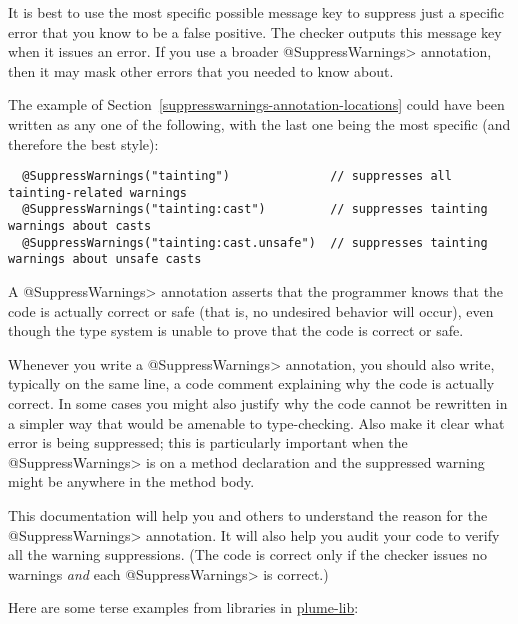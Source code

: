 

\label{compiler-message-keys}

It is best to use the most specific possible message key to suppress just a
specific error that you know to be a false positive.  The checker outputs
this message key when it issues an error.  If you use a broader
\<@SuppressWarnings> annotation, then it may mask other errors that you
needed to know about.

The example of Section~\ref{suppresswarnings-annotation-locations} could
have been written as any one of the following, with the last one being the
most specific (and therefore the best style):

\begin{Verbatim}
  @SuppressWarnings("tainting")              // suppresses all tainting-related warnings
  @SuppressWarnings("tainting:cast")         // suppresses tainting warnings about casts
  @SuppressWarnings("tainting:cast.unsafe")  // suppresses tainting warnings about unsafe casts
\end{Verbatim}



A \<@SuppressWarnings> annotation asserts that the programmer knows that
the code is actually correct or safe (that is, no undesired behavior will
occur), even though the type system is unable to prove that the code is
correct or safe.

Whenever you write a \<@SuppressWarnings> annotation, you should also
write, typically on the same line, a code comment
explaining why the code is actually correct.  In some cases you might also
justify why the code cannot be rewritten in a simpler way that would be
amenable to type-checking.  Also make it clear what error is being
suppressed; this is particularly important when the \<@SuppressWarnings> is
on a method declaration and the suppressed warning might be anywhere in the
method body.

This documentation will help you and others to understand the reason for
the \<@SuppressWarnings> annotation.  It will also help you audit your code
to verify all the warning suppressions.  (The code is correct only if the
checker issues no warnings \emph{and} each \<@SuppressWarnings> is correct.)

Here are some terse examples from libraries in \href{https://github.com/plume-lib/}{plume-lib}:


